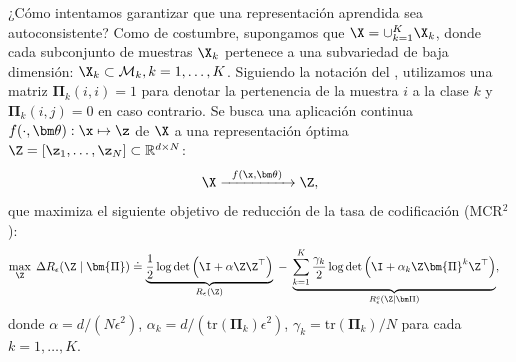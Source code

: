 \documentclass[../../book-main_es.tex]{subfiles}
\begin{document}
¿Cómo intentamos garantizar que una representación aprendida sea autoconsistente?
Como de costumbre, supongamos que $\X = \cup_{k=1}^K \X_k$, donde cada subconjunto de
muestras $\X_k$ pertenece a una subvariedad de baja dimensión: $\X_k
\subset \mathcal{M}_k, k = 1,\ldots, K$. Siguiendo la notación del
, utilizamos una matriz $\bm \Pi_k(i,i) = 1$ para denotar
la pertenencia de la muestra $i$ a la clase $k$ y $\bm
\Pi_k(i,j) = 0$ en caso contrario. Se busca una aplicación continua
$f(\cdot,\bm \theta): \x \mapsto \z$ de $\X$ a una representación óptima
$\Z = [\z_1, \ldots, \z_N] \subset \mathbb{R}^{d \times N}$:
\begin{equation}
    \X  \xrightarrow{\hspace{2mm} f(\x, \bm \theta) \hspace{2mm}} \Z,
    \label{eqn:LDR}
\end{equation}
que maximiza el siguiente objetivo de reducción de la tasa de codificación (MCR$^2$):
\begin{equation}\label{eq:mcr2-formulation}
    \begin{split}
        \max_{\Z} \; \Delta R_\epsilon(\Z  \mid \bm{\Pi}) %
        &\doteq \underbrace{\frac{1}{2}\log\det \Big(\I + {\alpha} \Z
        \Z^\top \Big)}_{R_{\epsilon}(\Z)} \;-\;
        \underbrace{\sum_{k=1}^{K}\frac{\gamma_k}{2} \log\det\Big(\I
                + {\alpha_k} \Z \bm{\Pi}^{k} \Z^\top
        \Big)}_{R^c_{\epsilon}(\Z \mid \bm \Pi)},
    \end{split}
\end{equation}
donde $\alpha = {d}/({N\epsilon^2})$, $\alpha_k =
d/({\mathrm{tr}(\bm{\Pi}_k)\epsilon^2})$, $\gamma_k =
{\mathrm{tr}(\bm{\Pi}_{k})}/{N}$ para cada $k = 1,\dots, K$.
\end{document}
